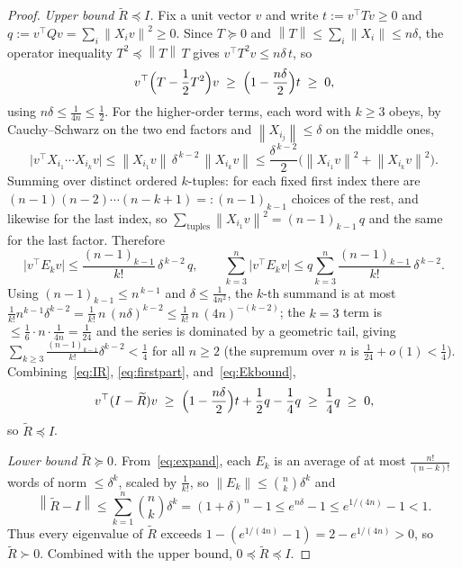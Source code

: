 \documentclass[11pt]{article}
\theoremstyle{definition}
\theoremstyle{remark}
\newcommand{\norm}[1]{\left\lVert #1 \right\rVert}
\newcommand{\psdle}{\preceq}
\newcommand{\psdge}{\succeq}
\begin{document}
\begin{proof}
\emph{Upper bound $\widetilde R\psdle I$.} Fix a unit vector $v$ and write $t:=v^\top Tv\ge0$ and
$q:=v^\top Qv=\sum_i\norm{X_iv}^2\ge0$. Since $T\psdge0$ and $\norm{T}\le\sum_i\norm{X_i}\le n\delta$,
the operator inequality $T^2\psdle\norm{T}\,T$ gives $v^\top T^2v\le n\delta\,t$, so
\begin{equation}\label{eq:firstpart}
v^\top\Bigl(T-\frac12T^2\Bigr)v\;\ge\;\Bigl(1-\frac{n\delta}2\Bigr)t\;\ge\;0,
\end{equation}
using $n\delta\le\frac1{4n}\le\frac12$. For the higher-order terms, each word with $k\ge3$ obeys,
by Cauchy--Schwarz on the two end factors and $\norm{X_{i_j}}\le\delta$ on the middle ones,
\[
\bigl|v^\top X_{i_1}\cdots X_{i_k}v\bigr|
\le\norm{X_{i_1}v}\,\delta^{\,k-2}\,\norm{X_{i_k}v}
\le\frac{\delta^{\,k-2}}2\bigl(\norm{X_{i_1}v}^2+\norm{X_{i_k}v}^2\bigr).
\]
Summing over distinct ordered $k$-tuples: for each fixed first index there are
$(n-1)(n-2)\cdots(n-k+1)=:(n-1)_{k-1}$ choices of the rest, and likewise for the last index, so
$\sum_{\text{tuples}}\norm{X_{i_1}v}^2=(n-1)_{k-1}\,q$ and the same for the last factor. Therefore
\begin{equation}\label{eq:Ekbound}
\bigl|v^\top E_kv\bigr|\le\frac{(n-1)_{k-1}}{k!}\,\delta^{\,k-2}\,q,
\qquad
\sum_{k=3}^n\bigl|v^\top E_kv\bigr|\le q\sum_{k=3}^n\frac{(n-1)_{k-1}}{k!}\,\delta^{\,k-2}.
\end{equation}
Using $(n-1)_{k-1}\le n^{\,k-1}$ and $\delta\le\frac1{4n^2}$, the $k$-th summand is at most
$\frac1{k!}n^{k-1}\delta^{k-2}=\frac1{k!}\,n\,(n\delta)^{k-2}\le\frac1{k!}\,n\,(4n)^{-(k-2)}$; the
$k=3$ term is $\le\frac16\cdot n\cdot\frac1{4n}=\frac1{24}$ and the series is dominated by a
geometric tail, giving $\sum_{k\ge3}\frac{(n-1)_{k-1}}{k!}\delta^{k-2}<\frac14$ for all $n\ge2$
(the supremum over $n$ is $\frac1{24}+o(1)<\frac14$). Combining~\eqref{eq:IR},
\eqref{eq:firstpart}, and~\eqref{eq:Ekbound},
\[
v^\top(I-\widetilde R)v\;\ge\;\Bigl(1-\frac{n\delta}2\Bigr)t+\frac12q-\frac14q\;\ge\;\frac14q\;\ge\;0,
\]
so $\widetilde R\psdle I$.

\emph{Lower bound $\widetilde R\psdge0$.} From~\eqref{eq:expand}, each $E_k$ is an average of at most
$\frac{n!}{(n-k)!}$ words of norm $\le\delta^k$, scaled by $\frac1{k!}$, so
$\norm{E_k}\le\binom nk\delta^k$ and
\[
\norm{\widetilde R-I}\le\sum_{k=1}^n\binom nk\delta^k=(1+\delta)^n-1\le e^{n\delta}-1\le
e^{1/(4n)}-1<1.
\]
Thus every eigenvalue of $\widetilde R$ exceeds $1-(e^{1/(4n)}-1)=2-e^{1/(4n)}>0$, so
$\widetilde R\succ0$. Combined with the upper bound, $0\psdle\widetilde R\psdle I$.
\end{proof}
\end{document}

